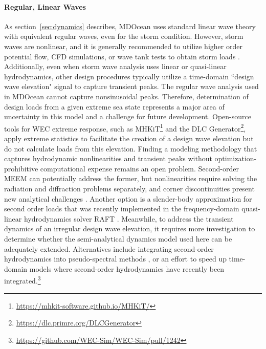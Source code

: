 \paragraph{Regular, Linear Waves}
As section~\ref{sec:dynamics} describes, MDOcean uses standard linear wave theory with equivalent regular waves, even for the storm condition.
However, storm waves are nonlinear, and it is generally recommended to utilize higher order potential flow, CFD simulations, or wave tank tests to obtain storm loads \cite{coe_survey_2018}.
Additionally, even when storm wave analysis uses linear or quasi-linear hydrodynamics, other design procedures typically utilize a time-domain ``design wave elevation" signal to capture transient peaks.
The regular wave analysis used in MDOcean cannot capture nonsinusoidal peaks.
Therefore, determination of design loads from a given extreme sea state represents a major area of uncertainty in this model and a challenge for future development.
Open-source tools for WEC extreme response, such as MHKiT\footnote{\url{https://mhkit-software.github.io/MHKiT/}} and the DLC Generator\footnote{\url{https://dlc.primre.org/DLCGenerator}}, apply extreme statistics to facilitate the creation of a design wave elevation but do not calculate loads from this elevation.
Finding a modeling methodology that captures hydrodynamic nonlinearities and transient peaks without optimization-prohibitive computational expense remains an open problem.
Second-order MEEM can potentially address the former, but nonlinearities require solving the radiation and diffraction problems separately, and corner discontinuities present new analytical challenges \cite{cong_novel_2020,mavrakos_second-order_2009}.
Another option is a slender-body approximation for second order loads that was recently implemented in the frequency-domain quasi-linear hydrodynamics solver RAFT \cite{carmo_slender-body_2025}.
Meanwhile, to address the transient dynamics of an irregular design wave elevation, it requires more investigation to determine whether the semi-analytical dynamics model used here can be adequately extended.
Alternatives include integrating second-order hydrodynamics into pseudo-spectral methods \cite{coe_initial_2020}, or an effort to speed up time-domain models where second-order hydrodynamics have recently been integrated.\footnote{\url{https://github.com/WEC-Sim/WEC-Sim/pull/1242}}

